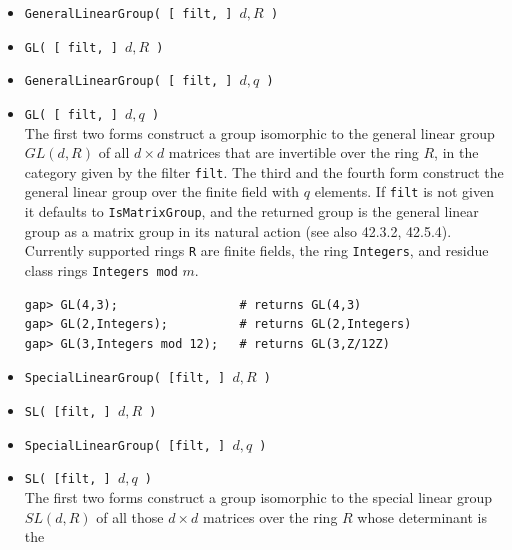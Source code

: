 \begin{itemize}
\item {\tt GeneralLinearGroup( [ filt, ] $d, R$ )}
\item {\tt GL( [ filt, ] $d, R$ )}
\item {\tt GeneralLinearGroup( [ filt, ] $d, q$ )}
\item {\tt GL( [ filt, ] $d, q$ )}\\
The first two forms construct a group isomorphic to the general linear group 
$GL( d, R )$ of all $d \times d$ matrices that are invertible over
the ring $R$, in the category given by the filter {\tt filt}. 
The third and the fourth form construct the general linear group over the finite
field with $q$ elements.
If {\tt filt} is not given it defaults to {\tt IsMatrixGroup}, and the returned group
is the general linear group as a matrix group in its natural action (see also 42.3.2, 42.5.4).
Currently supported rings {\tt R} are finite fields, the ring {\tt Integers}, and
residue class rings {\tt Integers mod} $m$.
{\codesize
\begin{verbatim}
gap> GL(4,3);                 # returns GL(4,3)
gap> GL(2,Integers);          # returns GL(2,Integers)
gap> GL(3,Integers mod 12);   # returns GL(3,Z/12Z)
\end{verbatim}}
\item {\tt SpecialLinearGroup( [filt, ] $d, R$ )}
\item {\tt SL( [filt, ] $d, R$ )}
\item {\tt SpecialLinearGroup( [filt, ] $d, q$ )}
\item {\tt SL( [filt, ] $d, q$ )}\\
The first two forms construct a group isomorphic to the special linear group 
$SL( d, R )$ of all those $d\times d$ matrices over the ring $R$ whose determinant is the

\end{itemize}
